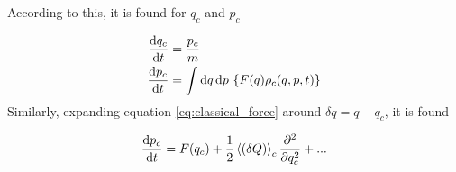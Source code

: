According to this, it is found for $q_c$ and $p_c$

\begin{align}
    \frac{\text d q_c}{\text d t} &= \dfrac{p_c}{m} \\
    \frac{\text d p_c}{\text d t} &= \int \text d{q}\,\text d{p} \,\left\{F(q)\rho_c(q, p, t)\right \} \label{eq:classical_force}
\end{align}
Similarly, expanding equation \eqref{eq:classical_force} around $\delta q = q - q_c$, it is found

\begin{equation}
    \frac{\text d p_c}{\text d t} = F(q_c) + \dfrac{1}{2}\left\langle (\delta Q) \right\rangle_c\frac{\partial ^2}{\partial q_c^2} + ...
\end{equation}
